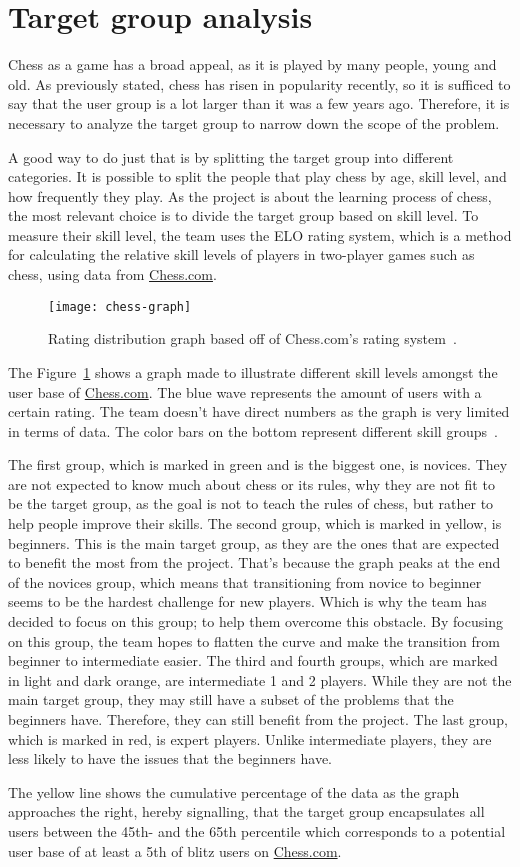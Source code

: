 \section{Target group analysis}\label{sec:target-group-analysis}

Chess as a game has a broad appeal, as it is played by many people, young and old.
As previously stated, chess has risen in popularity recently, so it is sufficed to say that the user group is a lot
larger than it was a few years ago.
Therefore, it is necessary to analyze the target group to narrow down the scope of the problem.

A good way to do just that is by splitting the target group into different categories.
It is possible to split the people that play chess by age, skill level, and how frequently they play.
As the project is about the learning process of chess, the most relevant choice is to divide the target group based on
skill level.
To measure their skill level, the team uses the ELO rating system, which is a method for calculating the relative skill
levels of players in two-player games such as chess, using data from \url{Chess.com}.

\begin{figure}[H]
    \centering
    \texttt{[image: chess-graph]}
    \caption{Rating distribution graph based off of Chess.com's rating system~\cite{chess-ratings}.}\label{fig:graph}
\end{figure}

The Figure~\ref{fig:graph} shows a graph made to illustrate different skill levels amongst the user base
of \url{Chess.com}.
The blue wave represents the amount of users with a certain rating.
The team doesn't have direct numbers as the graph is very limited in terms of data.
The color bars on the bottom represent different skill groups~\cite{chess-ratings}.

The first group, which is marked in green and is the biggest one, is novices.
They are not expected to know much about chess or its rules, why they are not fit to be the target group, as the
goal is not to teach the rules of chess, but rather to help people improve their skills.
The second group, which is marked in yellow, is beginners.
This is the main target group, as they are the ones that are expected to benefit the most from the project.
That's because the graph peaks at the end of the novices group, which means that transitioning from novice to beginner
seems to be the hardest challenge for new players.
Which is why the team has decided to focus on this group; to help them overcome this obstacle.
By focusing on this group, the team hopes to flatten the curve and make the transition from beginner to intermediate
easier.
The third and fourth groups, which are marked in light and dark orange, are intermediate 1 and 2 players.
While they are not the main target group, they may still have a subset of the problems that the beginners have.
Therefore, they can still benefit from the project.
The last group, which is marked in red, is expert players.
Unlike intermediate players, they are less likely to have the issues that the beginners have.

The yellow line shows the cumulative percentage of the data as the graph approaches the right, hereby signalling, that
the target group encapsulates all users between the 45th- and the 65th percentile which corresponds to a potential user
base of at least a 5th of blitz users on \url{Chess.com}.
